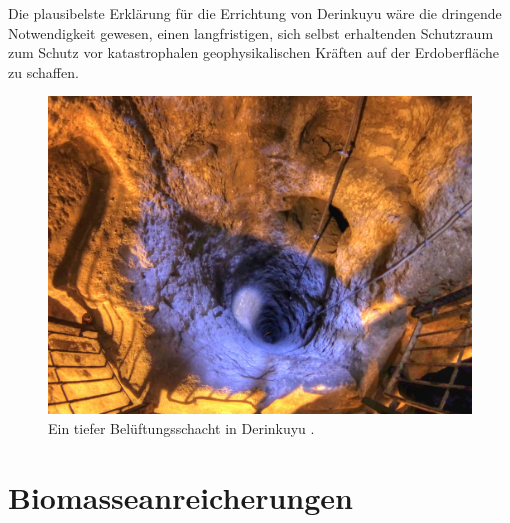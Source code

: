 \documentclass[10pt,twocolumn,letterpaper]{article}
\begin{document}
Die plausibelste Erklärung für die Errichtung von Derinkuyu wäre die dringende Notwendigkeit gewesen, einen langfristigen, sich selbst erhaltenden Schutzraum zum Schutz vor katastrophalen geophysikalischen Kräften auf der Erdoberfläche zu schaffen.

\begin{figure}[t]
\begin{center}
   \includegraphics[width=1\linewidth]{derinkuyu-air.jpg}
\end{center}
   \caption{Ein tiefer Belüftungsschacht in Derinkuyu \cite{53}.}
\label{fig:6}
\label{fig:onecol}
\end{figure}


\section{Biomasseanreicherungen}
\end{document}

